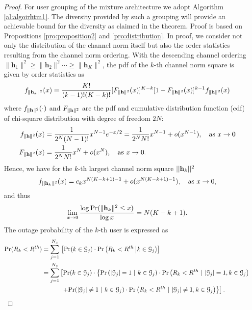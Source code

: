 \documentclass[11pt, draft, onecolumn ]{IEEEtran}
\begin{document}
\begin{proof} {}{For user grouping of the mixture architecture we adopt Algorithm \ref{al:algoirhtm1}.} The diversity provided by such a grouping will provide an achievable bound for the diversity as claimed in the theorem.  Proof is based on Propositions \ref{pro:proposition2} and   \ref{pro:distribution}.
In proof, we consider not only the distribution of the channel norm itself but also the order statistics resulting from the channel norm ordering.
    With the descending channel ordering $\|\mathbf{h}_1\|^2 \geq \|\mathbf{h}_2\|^2 \cdots\geq  \| \mathbf{h}_K\|^2 $,  the pdf of the $k$-th channel norm square  is given by order statistics as
\begin{equation}
        f_{\|{\bf h}_k\|^2}(x) =  \frac{K!}{(k-1)! (K-k)!} [F_{\|{\bf h}\|^2}(x)]^{K-k}[1- F_{\|{\bf h}\|^2}(x)]^{k-1} f_{\|{\bf h}\|^2}(x) \label{eq:pro2}
\end{equation}
where $f_{\|{\bf h}\|^2}(\cdot)$ and $F_{\|{\bf h}\|^2}$ are the pdf and cumulative distribution function (cdf) of chi-square distribution with degree of freedom $2 N$:
\begin{align}
            f_{\|{\bf h}\|^2}(x) &= \frac{1}{2^{N} (N - 1)!} x^{N-1} e^{-x/2}  = \frac{1}{2^{N} N!} x^{N - 1} + o( x^{N - 1}), \quad \mbox{as}~ x \rightarrow 0 \label{eq:pro1}\\
            F_{\|{\bf h}\|^2}(x) &= \frac{1}{2^{N} N!}   x^{N} + o( x^{N}), \quad \mbox{as}~ x \rightarrow 0.
\end{align}
Hence, we have for the $k$-th largest channel norm square $||{\bf h}_k||^2$
\begin{equation} \label{eq:degree_orderHbfk1}
f_{||{\bf h}_k||^2}(x) = c_k x^{N(K-k+1)-1} + o(x^{N(K-k+1)-1}), \quad \mbox{as}~ x \rightarrow 0,
\end{equation}
and thus
\begin{equation}\label{eq:degree_orderHbfk2}
        \lim_{x \rightarrow 0} \frac{ \log \mathrm{Pr} (\|{\bf h}_k\|^2 \leq x ) }{\log x} = N(K -k + 1).
\end{equation}
 The outage probability of the $k$-th user is expressed as
 \begin{align}
            \mathrm{Pr}(R_k < R^{th}) &= \sum_{j=1}^{N_g} \left.\left[\mathrm{Pr}( k \in {\cal G}_j )  \cdot  \mathrm{Pr} \left( R_k < R^{th} \right|  k \in {\cal G}_j \right)\right]  \\
                             &= \sum_{j=1}^{N_g} \left[ \mathrm{Pr}( k \in {\cal G}_j ) \cdot  \left\{ \mathrm{Pr}\left(|{\cal G}_j|  = 1 ~|~k \in {\cal G}_j\right) \cdot   \mathrm{Pr}\left(R_k < R^{th} ~|~ |{\cal G}_j|=1, k \in {\cal G}_j \right) \right.  \right.  \nonumber\\
            & \quad \quad \quad   \left. \left. +  \mathrm{Pr}( |{\cal G}_j| \neq 1 ~|~ k \in {\cal G}_j ) \cdot \mathrm{Pr}\left(R_k < R^{th} ~ | ~  |{\cal G}_j| \neq 1 ,k \in {\cal G}_j \right)  \right\} \right]. \label{eq:ProofTheo1_1}
 \end{align}






\end{proof}
\end{document}
